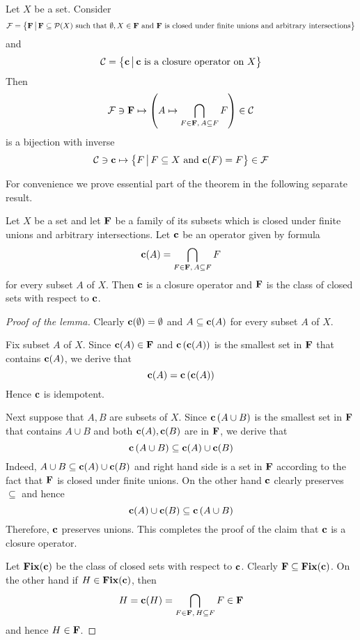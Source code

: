 \begin{theorem}\label{theorem:Kuratowski_closure_is_induced_by_a_closed_set_family}
	Let $X$ be a set. Consider
	$${\mathcal F} = \big\{\mathbf{F}\,\big|\,\mathbf{F}\subseteq {\mathcal P}(X)\mbox{ such that }\emptyset,X\in \mathbf{F}\mbox{ and }\mathbf{F}\mbox{ is closed under finite unions and arbitrary intersections}\big\}$$
	and
	$${\mathcal C} = \big\{\mathbf{c}\,\big|\,\mathbf{c}\mbox{ is a closure operator on }X\big\}$$
	Then
	$${\mathcal F} \ni \mathbf{F} \mapsto \left(A \mapsto \bigcap_{F\in \mathbf{F},\,A\subseteq F}F\right) \in {\mathcal C}$$
	is a bijection with inverse
	$${\mathcal C} \ni \mathbf{c} \mapsto \big\{F\,\big|\,F\subseteq X\mbox{ and }\mathbf{c}(F) = F\big\} \in {\mathcal F}$$
\end{theorem}
\noindent
For convenience we prove essential part of the theorem in the following separate result.

\begin{lemma}\label{lemma:closed_sets_give_rise_to_closure_operator}
	Let $X$ be a set and let $\mathbf{F}$ be a family of its subsets which is closed under finite unions and arbitrary intersections. Let $\mathbf{c}$ be an operator given by formula
	$$\mathbf{c}(A) = \bigcap_{F\in \mathbf{F},\,A\subseteq F}F$$
	for every subset $A$ of $X$. Then $\mathbf{c}$ is a closure operator and $\mathbf{F}$ is the class of closed sets with respect to $\mathbf{c}$.
\end{lemma}
\begin{proof}[Proof of the lemma]
	Clearly $\mathbf{c}(\emptyset) = \emptyset$ and $A\subseteq \mathbf{c}(A)$ for every subset $A$ of $X$.

	Fix subset $A$ of $X$. Since $\mathbf{c}(A) \in \mathbf{F}$ and $\mathbf{c}\left(\mathbf{c}(A)\right)$ is the smallest set in $\mathbf{F}$ that contains $\mathbf{c}(A)$, we derive that
	$$\mathbf{c}(A) = \mathbf{c}\left(\mathbf{c}(A)\right)$$
	Hence $\mathbf{c}$ is idempotent.

	Next suppose that $A,B$ are subsets of $X$. Since $\mathbf{c}\left(A\cup B\right)$ is the smallest set in $\mathbf{F}$ that contains $A\cup B$ and both $\mathbf{c}(A),\mathbf{c}(B)$ are in $\mathbf{F}$, we derive that
	$$\mathbf{c}\left(A\cup B\right) \subseteq \mathbf{c}(A) \cup \mathbf{c}(B)$$
	Indeed, $A\cup B \subseteq \mathbf{c}(A) \cup \mathbf{c}(B)$ and right hand side is a set in $\mathbf{F}$ according to the fact that $\mathbf{F}$ is closed under finite unions.
	On the other hand $\mathbf{c}$ clearly preserves $\subseteq$ and hence
	$$\mathbf{c}(A)\cup \mathbf{c}(B) \subseteq \mathbf{c}\left(A\cup B\right)$$
	Therefore, $\mathbf{c}$ preserves unions. This completes the proof of the claim that $\mathbf{c}$ is a closure operator.

	Let $\mathbf{Fix}(\mathbf{c})$ be the class of closed sets with respect to $\mathbf{c}$. Clearly $\mathbf{F} \subseteq \mathbf{Fix}(\mathbf{c})$. On the other hand if $H \in \mathbf{Fix}(\mathbf{c})$, then
	$$H = \mathbf{c}(H) = \bigcap_{F\in \mathbf{F},\,H\subseteq F}F \in \mathbf{F}$$
	and hence $H \in \mathbf{F}$.
\end{proof}

